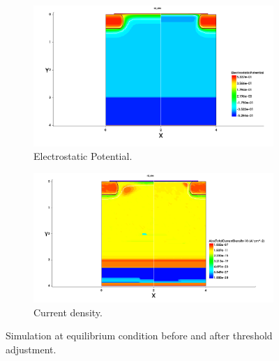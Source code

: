 \documentclass[11pt,a4paper]{article}
\begin{document}
		\begin{figure}
			\centering
			\begin{subfigure}[b]{0.45\textwidth}
				\centering
				\includegraphics[width=\textwidth]{electrostatic_potential1122}
				\caption{Electrostatic Potential.}
				\label{equilibrium1}
			\end{subfigure}
			\hfill
			\begin{subfigure}[b]{0.45\textwidth}
				\centering
				\includegraphics[width=\textwidth]{currents1122}
				\caption{Current density.}
				\label{equilibrium2}
			\end{subfigure}
			\caption{Simulation at equilibrium condition before and after threshold adjustment.}
			\label{equilibrium12}
		\end{figure}
		
\end{document}
